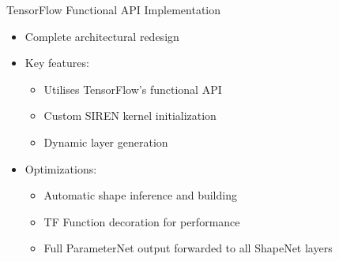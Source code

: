 \documentclass{beamer}
\begin{document}
\begin{frame}{TensorFlow Functional API Implementation}
    \begin{itemize}
        \item Complete architectural redesign
        \item Key features:
        \begin{itemize}
            \item Utilises TensorFlow's functional API
            \item Custom SIREN kernel initialization
            \item Dynamic layer generation
        \end{itemize}
        \item Optimizations:
        \begin{itemize}
            \item Automatic shape inference and building
            \item TF Function decoration for performance
            \item Full ParameterNet output forwarded to all ShapeNet layers
        \end{itemize}
    \end{itemize}
\end{frame}
\end{document}
